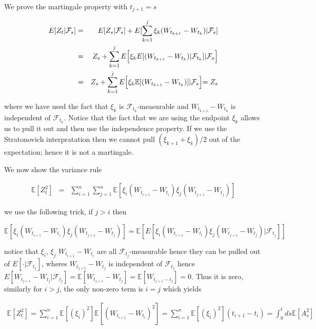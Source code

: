 \documentclass[11pt,a4paper]{article}
\begin{document}
We prove the martingale property with $t_{j+1} = s$

\begin{eqnarray}
    E[Z_t|\mathcal{F}_s] &=& E[Z_s|\mathcal{F}_s] + E[\sum_{k=1}^{j}\xi_{k}(W_{t_{k+1}}-W_{t_{k}})|\mathcal{F}_s]\\
    &=& Z_s + \sum_{k=1}^{j}E\Bigl[\xi_{k}E[(W_{t_{k+1}}-W_{t_{k}})|\mathcal{F}_{t_{k}}]|\mathcal{F}_s\Bigl] \\
    &=& Z_s + \sum_{k=1}^{j}E\Bigl[\xi_{k}\mathbb{E}[(W_{t_{k+1}}-W_{t_{k}})]|\mathcal{F}_s\Bigl] = Z_s 
\end{eqnarray}

where we have used the fact that $\xi_{k}$ is $\mathcal{F}_{t_k}$-measurable and $W_{t_{k+1}}-W_{t_{k}}$ is independent of $\mathcal{F}_{t_{k}}$. Notice that the fact that we are using the endpoint $\xi_{k}$ allows us to pull it out and then use the independence property. If we use the Stratonovich interpratation then we cannot pull $(\xi_{k+1}+\xi_{k})/2$ out of the expectation; hence it is not a martingale.


We now show the variance rule

\begin{eqnarray}
\mathbb{E}[Z_t^2]  &=& \sum_{i=1}^{n}\sum_{j=1}^{n} \mathbb{E}[\xi_i(W_{t_{i+1}}-W_{t_i})\xi_j(W_{t_{j+1}}-W_{t_j})]
\end{eqnarray}

we use the following trick, if $j>i$ then

\begin{equation}
    \mathbb{E}[\xi_i(W_{t_{i+1}}-W_{t_i})\xi_j(W_{t_{j+1}}-W_{t_j})]= \mathbb{E}[E[\xi_i(W_{t_{i+1}}-W_{t_i})\xi_j(W_{t_{j+1}}-W_{t_j})|\mathcal{F}_{t_j}]]
\end{equation}

notice that $\xi_i$, $\xi_j$ $W_{t_{i+1}}-W_{t_{i}}$ are all $\mathcal{F}_{t_j}$-measurable hence they can be pulled out of $E[\cdot |\mathcal{F}_{t_j}]$, wheres $W_{t_{j+1}}-W_{t_{j}}$ is independent of $\mathcal{F}_{t_j}$ hence $E[W_{t_{j+1}}-W_{t_{j}}|\mathcal{F}_{t_j}] = \mathbb{E}[W_{t_{j+1}}-W_{t_{j}}] = \mathbb{E}[W_{t_{j+1}-t_{j}}] = 0$. Thus it is zero, similarly for $i>j$, the only non-zero term is $i=j$ which yields

\begin{eqnarray}
    \mathbb{E}[Z_t^2] =  \sum_{i=1}^{n}\mathbb{E}[(\xi_i)^2]\mathbb{E}[(W_{t_{i+1}}-W_{t_i})^2] =   \sum_{i=1}^{n}\mathbb{E}[(\xi_i)^2](t_{i+1}-t_i) = \int_{0}^t ds\mathbb{E}[A_s^2]
\end{eqnarray}
\end{document}
